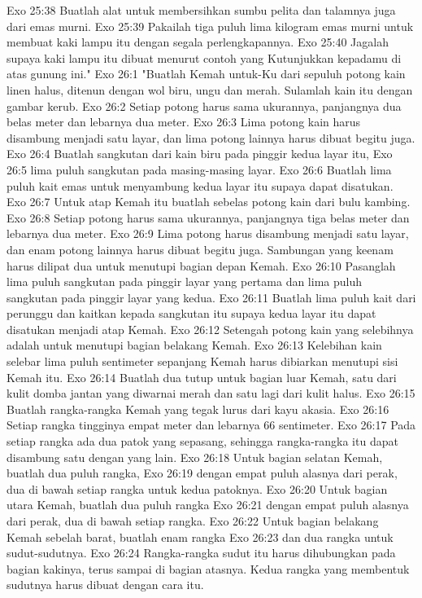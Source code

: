Exo 25:38  Buatlah alat untuk membersihkan sumbu pelita dan talamnya juga dari emas murni.
Exo 25:39  Pakailah tiga puluh lima kilogram emas murni untuk membuat kaki lampu itu dengan segala perlengkapannya.
Exo 25:40  Jagalah supaya kaki lampu itu dibuat menurut contoh yang Kutunjukkan kepadamu di atas gunung ini."
Exo 26:1  "Buatlah Kemah untuk-Ku dari sepuluh potong kain linen halus, ditenun dengan wol biru, ungu dan merah. Sulamlah kain itu dengan gambar kerub.
Exo 26:2  Setiap potong harus sama ukurannya, panjangnya dua belas meter dan lebarnya dua meter.
Exo 26:3  Lima potong kain harus disambung menjadi satu layar, dan lima potong lainnya harus dibuat begitu juga.
Exo 26:4  Buatlah sangkutan dari kain biru pada pinggir kedua layar itu,
Exo 26:5  lima puluh sangkutan pada masing-masing layar.
Exo 26:6  Buatlah lima puluh kait emas untuk menyambung kedua layar itu supaya dapat disatukan.
Exo 26:7  Untuk atap Kemah itu buatlah sebelas potong kain dari bulu kambing.
Exo 26:8  Setiap potong harus sama ukurannya, panjangnya tiga belas meter dan lebarnya dua meter.
Exo 26:9  Lima potong harus disambung menjadi satu layar, dan enam potong lainnya harus dibuat begitu juga. Sambungan yang keenam harus dilipat dua untuk menutupi bagian depan Kemah.
Exo 26:10  Pasanglah lima puluh sangkutan pada pinggir layar yang pertama dan lima puluh sangkutan pada pinggir layar yang kedua.
Exo 26:11  Buatlah lima puluh kait dari perunggu dan kaitkan kepada sangkutan itu supaya kedua layar itu dapat disatukan menjadi atap Kemah.
Exo 26:12  Setengah potong kain yang selebihnya adalah untuk menutupi bagian belakang Kemah.
Exo 26:13  Kelebihan kain selebar lima puluh sentimeter sepanjang Kemah harus dibiarkan menutupi sisi Kemah itu.
Exo 26:14  Buatlah dua tutup untuk bagian luar Kemah, satu dari kulit domba jantan yang diwarnai merah dan satu lagi dari kulit halus.
Exo 26:15  Buatlah rangka-rangka Kemah yang tegak lurus dari kayu akasia.
Exo 26:16  Setiap rangka tingginya empat meter dan lebarnya 66 sentimeter.
Exo 26:17  Pada setiap rangka ada dua patok yang sepasang, sehingga rangka-rangka itu dapat disambung satu dengan yang lain.
Exo 26:18  Untuk bagian selatan Kemah, buatlah dua puluh rangka,
Exo 26:19  dengan empat puluh alasnya dari perak, dua di bawah setiap rangka untuk kedua patoknya.
Exo 26:20  Untuk bagian utara Kemah, buatlah dua puluh rangka
Exo 26:21  dengan empat puluh alasnya dari perak, dua di bawah setiap rangka.
Exo 26:22  Untuk bagian belakang Kemah sebelah barat, buatlah enam rangka
Exo 26:23  dan dua rangka untuk sudut-sudutnya.
Exo 26:24  Rangka-rangka sudut itu harus dihubungkan pada bagian kakinya, terus sampai di bagian atasnya. Kedua rangka yang membentuk sudutnya harus dibuat dengan cara itu.
